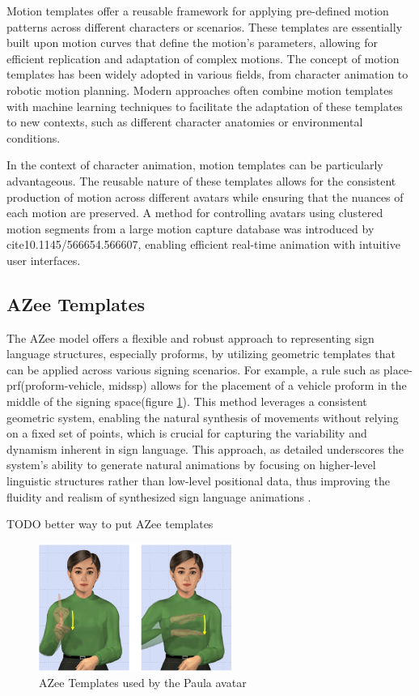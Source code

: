 \documentclass[../../main.tex]{subfiles}
\begin{document}
Motion templates offer a reusable framework for applying pre-defined motion patterns across different characters or scenarios. These templates are essentially built upon motion curves that define the motion's parameters, allowing for efficient replication and adaptation of complex motions. The concept of motion templates has been widely adopted in various fields, from character animation to robotic motion planning. Modern approaches often combine motion templates with machine learning techniques to facilitate the adaptation of these templates to new contexts, such as different character anatomies or environmental conditions.

In the context of character animation, motion templates can be particularly advantageous. The reusable nature of these templates allows for the consistent production of motion across different avatars while ensuring that the nuances of each motion are preserved. A method for controlling avatars using clustered motion segments from a large motion capture database was introduced by cite{10.1145/566654.566607}, enabling efficient real-time animation with intuitive user interfaces.

\subsection{AZee Templates}

The AZee model offers a flexible and robust approach to representing sign language structures, especially proforms, by utilizing geometric templates that can be applied across various signing scenarios. For example, a rule such as place-prf(proform-vehicle, midssp) allows for the placement of a vehicle proform in the middle of the signing space(figure \ref{fig:azee_template_example}). This method leverages a consistent geometric system, enabling the natural synthesis of movements without relying on a fixed set of points, which is crucial for capturing the variability and dynamism inherent in sign language. This approach, as detailed underscores the system's ability to generate natural animations by focusing on higher-level linguistic structures rather than low-level positional data, thus improving the fluidity and realism of synthesized sign language animations \cite{filhol2018extending}.

TODO better way to put AZee templates

\begin{figure}
    \centering \includegraphics[width = 2.5in]{chapters/intermediate_blocks/images/azee_template_example.png}
    \caption{AZee Templates used by the Paula avatar}
    \label{fig:azee_template_example}
\end{figure}
\end{document}
